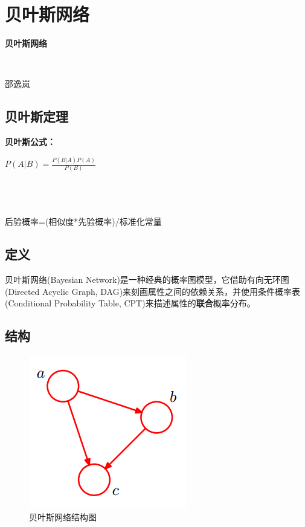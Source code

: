 \section*{贝叶斯网络}

\begin{frame}
\centerline{\textbf{\Large{贝叶斯网络}}} 
~\\
\centerline{\large{邵逸岚}}
\end{frame}

\subsection*{贝叶斯定理}
\begin{frame}
	\textbf{贝叶斯公式：}
	~\\
	\centerline{{\large $P(A|B)=\frac{P(B|A)P(A)}{P(B)}$}}
	~\\
	~\\
	~\\
	后验概率=(相似度*先验概率)/标准化常量 
\end{frame}

\subsection*{定义}
\begin{frame}
	贝叶斯网络(Bayesian Network)是一种经典的概率图模型，它借助有向无环图(Directed Acyclic Graph, DAG)来刻画属性之间的依赖关系，并使用条件概率表(Conditional Probability Table, CPT)来描述属性的\textbf{联合}概率分布。
\end{frame}

\subsection*{结构}
\begin{frame}
	\begin{figure}
		\centering
		\includegraphics[scale=0.5]{topic/BayesianNetwork/bn.png}
		\caption{贝叶斯网络结构图}
		\label{0-002}
	\end{figure}
\end{frame}

